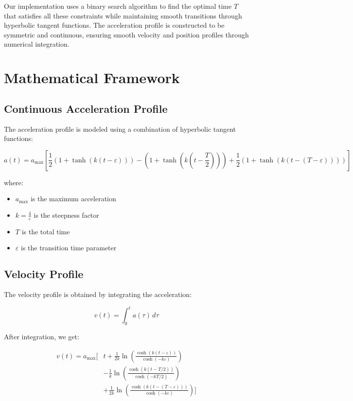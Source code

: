 \documentclass[12pt,a4paper]{article}
\begin{document}
Our implementation uses a binary search algorithm to find the optimal time $T$ that satisfies all these constraints while maintaining smooth transitions through hyperbolic tangent functions. The acceleration profile is constructed to be symmetric and continuous, ensuring smooth velocity and position profiles through numerical integration.

\section{Mathematical Framework}

\subsection{Continuous Acceleration Profile}
The acceleration profile is modeled using a combination of hyperbolic tangent functions:

\begin{equation}
a(t) = a_{\text{max}}\left[\frac{1}{2}(1 + \tanh(k(t-\varepsilon))) - (1 + \tanh(k(t-\frac{T}{2}))) + \frac{1}{2}(1 + \tanh(k(t-(T-\varepsilon))))\right]
\end{equation}

where:
\begin{itemize}
\item $a_{\text{max}}$ is the maximum acceleration
\item $k = \frac{4}{\varepsilon}$ is the steepness factor
\item $T$ is the total time
\item $\varepsilon$ is the transition time parameter
\end{itemize}

\subsection{Velocity Profile}
The velocity profile is obtained by integrating the acceleration:

\begin{equation}
v(t) = \int_0^t a(\tau)\,d\tau
\end{equation}

After integration, we get:

\begin{equation}
\begin{split}
v(t) = a_{\text{max}}\Big[&t + \frac{1}{2k}\ln\left(\frac{\cosh(k(t-\varepsilon))}{\cosh(-k\varepsilon)}\right) \\
&- \frac{1}{k}\ln\left(\frac{\cosh(k(t-T/2))}{\cosh(-kT/2)}\right) \\
&+ \frac{1}{2k}\ln\left(\frac{\cosh(k(t-(T-\varepsilon)))}{\cosh(-k\varepsilon)}\right)\Big]
\end{split}
\end{equation}
\end{document}
